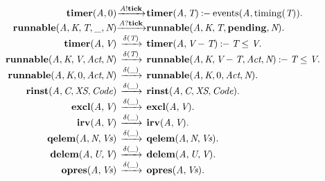\[
\begin{array}{r@{}c@{}l}
\\\Prule{\Tstep{\Ttimer{\Tvar{A}}{0}}{\Tsay{\Tvar{A}}{\Tatom{tick}}}{\Ttimer{\Tvar{A}}{\Tvar{T}}}}{\Tevents{\Tvar{A}}{\Ttiming{\Tvar{T}}}}.
\\\Pfact{\Tstep{\Trunnable{\Tvar{A}}{\Tvar{K}}{\Tvar{T}}{\_}{\Tvar{N}}}{\Thear{\Tvar{A}}{\Tatom{tick}}}{\Trunnable{\Tvar{A}}{\Tvar{K}}{\Tvar{T}}{\Tatom{pending}}{\Tvar{N}}}}.
\\\Prule{\Tstep{\Ttimer{\Tvar{A}}{\Tvar{V}}}{\Tdelta{\Tvar{T}}}{\Ttimer{\Tvar{A}}{\Tminus{\Tvar{V}}{\Tvar{T}}}}}{\Tlesseq{\Tvar{T}}{\Tvar{V}}}.
\\\Prule{\Tstep{\Trunnable{\Tvar{A}}{\Tvar{K}}{\Tvar{V}}{\Tvar{Act}}{\Tvar{N}}}{\Tdelta{\Tvar{T}}}{\Trunnable{\Tvar{A}}{\Tvar{K}}{\Tminus{\Tvar{V}}{\Tvar{T}}}{\Tvar{Act}}{\Tvar{N}}}}{\Tlesseq{\Tvar{T}}{\Tvar{V}}}.
\\\Pfact{\Tstep{\Trunnable{\Tvar{A}}{\Tvar{K}}{0}{\Tvar{Act}}{\Tvar{N}}}{\Tdelta{\_}}{\Trunnable{\Tvar{A}}{\Tvar{K}}{0}{\Tvar{Act}}{\Tvar{N}}}}.
\\\Pfact{\Tstep{\Trinst{\Tvar{A}}{\Tvar{C}}{\Tvar{XS}}{\Tvar{Code}}}{\Tdelta{\_}}{\Trinst{\Tvar{A}}{\Tvar{C}}{\Tvar{XS}}{\Tvar{Code}}}}.
\\\Pfact{\Tstep{\Texcl{\Tvar{A}}{\Tvar{V}}}{\Tdelta{\_}}{\Texcl{\Tvar{A}}{\Tvar{V}}}}.
\\\Pfact{\Tstep{\Tirv{\Tvar{A}}{\Tvar{V}}}{\Tdelta{\_}}{\Tirv{\Tvar{A}}{\Tvar{V}}}}.
\\\Pfact{\Tstep{\Tqelem{\Tvar{A}}{\Tvar{N}}{\Tvar{Vs}}}{\Tdelta{\_}}{\Tqelem{\Tvar{A}}{\Tvar{N}}{\Tvar{Vs}}}}.
\\\Pfact{\Tstep{\Tdelem{\Tvar{A}}{\Tvar{U}}{\Tvar{V}}}{\Tdelta{\_}}{\Tdelem{\Tvar{A}}{\Tvar{U}}{\Tvar{V}}}}.
\\\Pfact{\Tstep{\Topres{\Tvar{A}}{\Tvar{Vs}}}{\Tdelta{\_}}{\Topres{\Tvar{A}}{\Tvar{Vs}}}}.
\end{array}
\]
